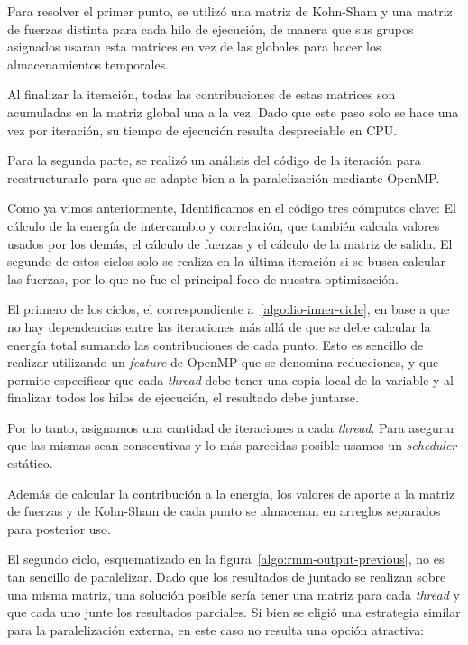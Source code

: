 Para resolver el primer punto, se utiliz\'o una matriz de Kohn-Sham y una matriz de
fuerzas distinta para cada hilo de ejecuci\'on, de manera que sus grupos asignados
usaran esta matrices en vez de las globales para hacer los almacenamientos temporales.

Al finalizar la iteraci\'on, todas
las contribuciones de estas matrices son acumuladas en la matriz global una a la
vez. Dado que este paso solo se hace una vez por iteraci\'on, su tiempo de ejecuci\'on resulta
despreciable en CPU.


Para la segunda parte, se realiz\'o un an\'alisis del c\'odigo de la iteraci\'on para
reestructurarlo para que se adapte bien a la paralelizaci\'on mediante OpenMP.

Como ya vimos anteriormente, Identificamos en el c\'odigo tres c\'omputos clave:
El c\'alculo de la energ\'ia de intercambio y
correlaci\'on, que tambi\'en calcula valores usados por los dem\'as, el
c\'alculo de fuerzas y el c\'alculo de la matriz de salida. El segundo de estos
ciclos solo se realiza en la \'ultima iteraci\'on si se busca calcular las fuerzas,
por lo que no fue el principal foco de nuestra optimizaci\'on.

El primero de los ciclos, el correspondiente a~\ref{algo:lio-inner-cicle}, en base a que no hay dependencias entre
las iteraciones m\'as all\'a de que se debe calcular la energ\'ia total sumando
las contribuciones de cada punto. Esto es sencillo de realizar utilizando un
\textit{feature} de OpenMP que se denomina reducciones, y que permite especificar
que cada \textit{thread} debe tener una copia local de la variable y al finalizar
todos los hilos de ejecuci\'on, el resultado debe juntarse.

Por lo tanto, asignamos una cantidad de iteraciones a cada \textit{thread}. Para
asegurar que las mismas sean consecutivas y lo m\'as parecidas posible usamos un
\textit{scheduler} est\'atico.

Adem\'as de calcular la contribuci\'on a la energ\'ia, los valores de aporte a
la matriz de fuerzas y de Kohn-Sham de cada punto se almacenan en arreglos
separados para posterior uso.

El segundo ciclo, esquematizado en la figura~\ref{algo:rmm-output-previous}, no es tan
sencillo de paralelizar. Dado que los resultados de juntado se realizan sobre
una misma matriz, una soluci\'on posible ser\'ia tener una matriz para cada
\textit{thread} y que cada uno junte los resultados parciales. Si bien se
eligi\'o una estrategia similar para la paralelizaci\'on externa, en este caso no
resulta una opci\'on atractiva:

